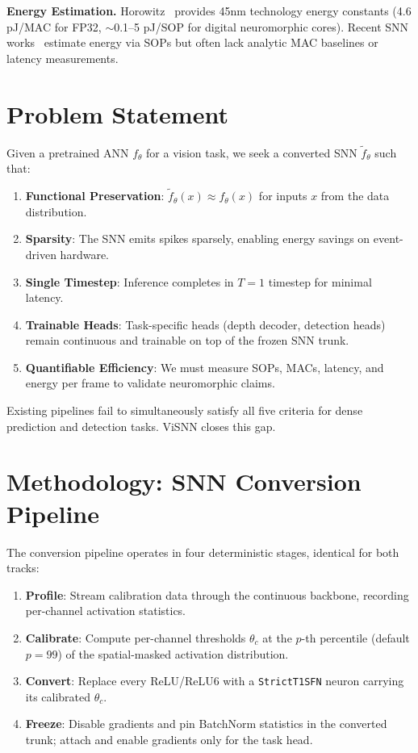 \documentclass[10pt,conference]{IEEEtran}
\begin{document}
\textbf{Energy Estimation.} Horowitz~\cite{horowitz2014computing} provides 45nm technology energy constants (4.6 pJ/MAC for FP32, $\sim$0.1--5 pJ/SOP for digital neuromorphic cores). Recent SNN works~\cite{kim2023scale, yin2023spiking} estimate energy via SOPs but often lack analytic MAC baselines or latency measurements.

\section{Problem Statement}
\label{sec:problem}

Given a pretrained ANN $f_\theta$ for a vision task, we seek a converted SNN $\tilde{f}_\theta$ such that:

\begin{enumerate}
    \item \textbf{Functional Preservation}: $\tilde{f}_\theta(x) \approx f_\theta(x)$ for inputs $x$ from the data distribution.
    \item \textbf{Sparsity}: The SNN emits spikes sparsely, enabling energy savings on event-driven hardware.
    \item \textbf{Single Timestep}: Inference completes in $T=1$ timestep for minimal latency.
    \item \textbf{Trainable Heads}: Task-specific heads (depth decoder, detection heads) remain continuous and trainable on top of the frozen SNN trunk.
    \item \textbf{Quantifiable Efficiency}: We must measure SOPs, MACs, latency, and energy per frame to validate neuromorphic claims.
\end{enumerate}

Existing pipelines fail to simultaneously satisfy all five criteria for dense prediction and detection tasks. ViSNN closes this gap.


\section{Methodology: SNN Conversion Pipeline}
\label{sec:methodology_conversion}

The conversion pipeline operates in four deterministic stages, identical for both tracks:

\begin{enumerate}
    \item \textbf{Profile}: Stream calibration data through the continuous backbone, recording per-channel activation statistics.
    \item \textbf{Calibrate}: Compute per-channel thresholds $\theta_c$ at the $p$-th percentile (default $p=99$) of the spatial-masked activation distribution.
    \item \textbf{Convert}: Replace every ReLU/ReLU6 with a \texttt{StrictT1SFN} neuron carrying its calibrated $\theta_c$.
    \item \textbf{Freeze}: Disable gradients and pin BatchNorm statistics in the converted trunk; attach and enable gradients only for the task head.
\end{enumerate}
\end{document}
